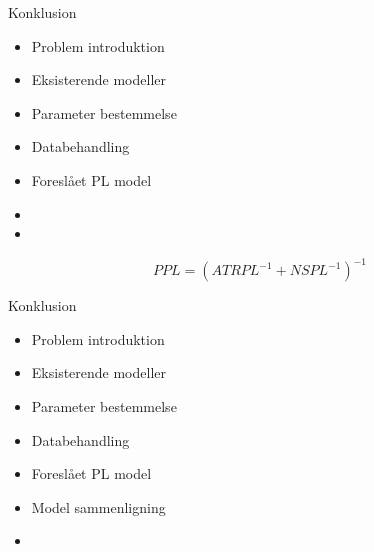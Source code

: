 \begin{frame}{Konklusion}
	\begin{minipage}{0.5\textwidth}
		\begin{itemize}
		\item Problem introduktion
		\item Eksisterende modeller
		\item Parameter bestemmelse
		\item Databehandling
		\item Foreslået PL model
		\item[] 
		\item[] 
		\end{itemize}
	\end{minipage}%
	\begin{minipage}{0.5\textwidth}
		\begin{equation*}
		PPL = \left(ATRPL^{-1} + NSPL^{-1}\right)^{-1} 
		\end{equation*}
	\end{minipage}%
\end{frame}

\begin{frame}{Konklusion}
	\begin{minipage}{0.5\textwidth}
		\begin{itemize}
		\item Problem introduktion
		\item Eksisterende modeller
		\item Parameter bestemmelse
		\item Databehandling
		\item Foreslået PL model
		\item Model sammenligning
		\item[] 
		\end{itemize}
	\end{minipage}%
	\begin{minipage}{0.5\textwidth}
	\end{minipage}%
\end{frame}

